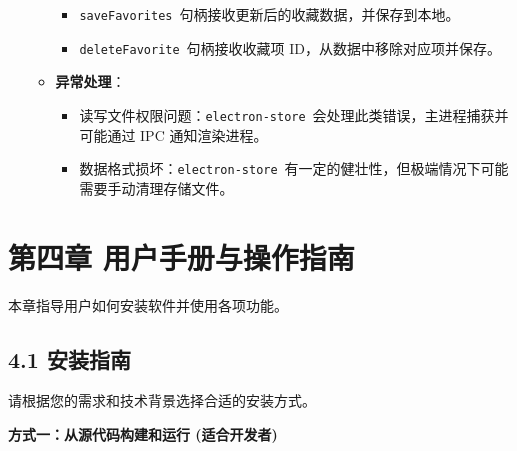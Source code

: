 \documentclass{article}
\begin{document}
\begin{itemize}
\begin{itemize}
\begin{itemize}
            \item \texttt{saveFavorites}\ 句柄接收更新后的收藏数据，并保存到本地。
            \item \texttt{deleteFavorite}\ 句柄接收收藏项 ID，从数据中移除对应项并保存。
        \end{itemize}
        \item \textbf{异常处理}：
        \begin{itemize}
            \item 读写文件权限问题：\texttt{electron-store}\ 会处理此类错误，主进程捕获并可能通过 IPC 通知渲染进程。
            \item 数据格式损坏：\texttt{electron-store}\ 有一定的健壮性，但极端情况下可能需要手动清理存储文件。
        \end{itemize}
    \end{itemize}
\end{itemize}

\hrulefill

\section*{第四章 用户手册与操作指南}

本章指导用户如何安装软件并使用各项功能。

\subsection*{4.1 安装指南}

请根据您的需求和技术背景选择合适的安装方式。

\textbf{方式一：从源代码构建和运行 (适合开发者)}
\end{document}

